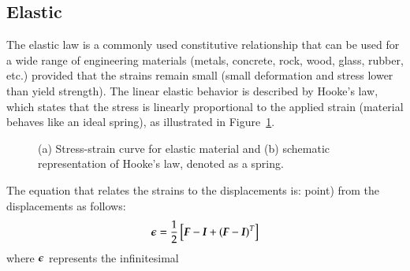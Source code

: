 \subsection{Elastic} 
The elastic law is a
commonly used constitutive relationship that can be used for a wide
range of engineering materials (\eg metals, concrete, rock, wood,
glass, rubber, etc.) provided that the strains remain small (\ie small
deformation and stress lower than yield strength). The linear elastic
behavior is described by Hooke's law, which states that the stress is
linearly proportional to the applied strain (material behaves like an
ideal spring), as illustrated in Figure~\ref{fig:smm:cl:elastic}.
\begin{figure}[!htb]
  \begin{center}

    \hspace{0.05\textwidth} 
    \caption{(a) Stress-strain curve for elastic material and (b)
      schematic representation of Hooke's law, denoted as a spring.}
    \label{fig:smm:cl:elastic}
  \end{center}
\end{figure} 
The equation that relates the strains to the
displacements is: %
point) from the displacements as follows:
\begin{equation}
\label{eqn:smm:strain_inf} 
\boldsymbol{\epsilon} =
\frac{1}{2} \left[ \boldsymbol{F}-\boldsymbol{I}+(\boldsymbol{F}-\boldsymbol{I})^T \right]
\end{equation} where $\boldsymbol{\epsilon}$ represents the infinitesimal
